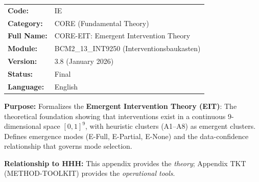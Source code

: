 \begin{tcolorbox}[colback=gray!5!white, colframe=gray!75!black,
    title=Appendix Header: IE CORE-EIT]

\begin{tabular}{@{}ll@{}}
\textbf{Code:} & IE \\
\textbf{Category:} & CORE (Fundamental Theory) \\
\textbf{Full Name:} & CORE-EIT: Emergent Intervention Theory \\
\textbf{Module:} & BCM2\_13\_INT9250 (Interventionsbaukasten) \\
\textbf{Version:} & 3.8 (January 2026) \\
\textbf{Status:} & Final \\
\textbf{Language:} & English \\
\end{tabular}

\vspace{0.5em}
\textbf{Purpose:} Formalizes the \textbf{Emergent Intervention Theory (EIT)}:
The theoretical foundation showing that interventions exist in a continuous
9-dimensional space $[0,1]^9$, with heuristic clusters (A1--A8) as emergent
clusters. Defines emergence modes (E-Full, E-Partial, E-None) and the
data-confidence relationship that governs mode selection.

\textbf{Relationship to HHH:} This appendix provides the \textit{theory};
Appendix TKT (METHOD-TOOLKIT) provides the \textit{operational tools}.

\end{tcolorbox}

%
%
%
%

